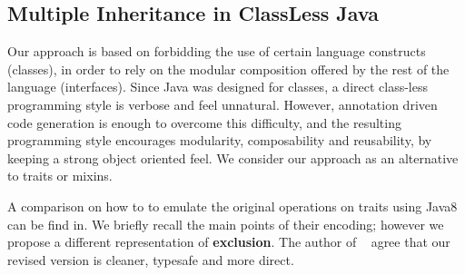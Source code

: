 \subsection{Multiple Inheritance in ClassLess Java}
\begin{comment}
Haoyuan

   - vs both: we do automatic return type refinement, which has useful applications
   (example: Expression Problem)

   - vs traits: we support of methods to create new objects (a replacement to constructors);
   Moreover we have the with and clone methods (we miss more applications for those). Show
   how to model the operations on traits; discuss operations that we cannot model
   (example: renaming).

   - vs mixins: we use the trait model of explicitly resolving conflicts. This is arguably
   better for reasoning.
\end{comment}

Our approach is based on forbidding the use of certain language constructs (classes), in order to rely on the modular composition offered by the rest of the language (interfaces).
Since Java was designed for classes, a direct class-less programming style is verbose and feel unnatural. However, annotation driven code generation is enough to overcome this difficulty, and
the resulting programming style encourages modularity, composability and reusability, by keeping a strong object oriented feel.
We consider our approach as an alternative to traits or mixins.

A comparison on how to to emulate the original operations on traits using Java8 can be find in\cite{bono14}. We briefly recall the main points of their encoding; however we propose a different representation of
 \textbf{exclusion}.
The author of ~\cite{bono14} agree that our revised version is cleaner, typesafe and more direct.

